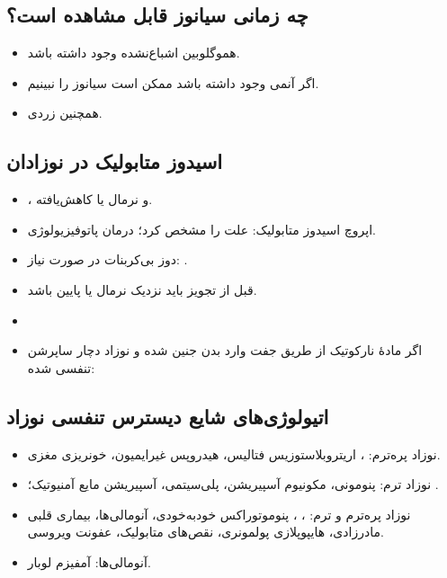 \documentclass[12pt,a4paper]{article}
\begin{document}
\subsection*{چه زمانی سیانوز قابل مشاهده است؟}
\begin{itemize}
\item {} هموگلوبین اشباع‌نشده وجود داشته باشد.
\item اگر آنمی وجود داشته باشد ممکن است سیانوز را نبینیم.
\item همچنین زردی.
\end{itemize}

\subsection*{اسیدوز متابولیک در نوزادان}
\begin{itemize}
\item {}،  و  نرمال یا کاهش‌یافته.
\item اپروچ اسیدوز متابولیک: علت را مشخص کرد؛ درمان پاتوفیزیولوژی.
\item دوز بی‌کربنات در صورت نیاز: .
\item قبل از تجویز باید  نزدیک نرمال یا پایین باشد.
\item {}
\item اگر مادهٔ نارکوتیک از طریق جفت وارد بدن جنین شده و نوزاد دچار ساپرشن تنفسی شده:
\end{itemize}
\subsection*{اتیولوژی‌های شایع دیسترس تنفسی نوزاد}
\begin{itemize}
\item نوزاد پره‌ترم: ، اریتروبلاستوزیس فتالیس، هیدروپس غیرایمیون، خونریزی مغزی.
\item نوزاد ترم: پنومونی\lr{*}، مکونیوم آسپیریشن، پلی‌سیتمی، آسپیریشن مایع آمنیوتیک؛
.
\item نوزاد پره‌ترم و ترم: ، ، پنوموتوراکس خودبه‌خودی، آنومالی‌ها، بیماری قلبی مادرزادی، هایپوپلازی پولمونری، نقص‌های متابولیک، عفونت ویروسی.
\item آنومالی‌ها: آمفیزم لوبار.
\end{itemize}
\end{document}
